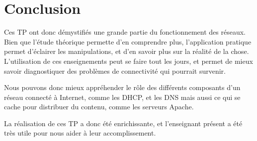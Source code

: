 \documentclass[12pt,a4paper]{book} %
\begin{document}
\cleardoublepage %

\pagestyle{empty}


\chapter*{Conclusion}

Ces TP ont donc démystifiés une grande partie du fonctionnement des réseaux. Bien que l'étude théorique permette d'en comprendre plus, l'application pratique permet d'éclairer les manipulations, et d'en savoir plus sur la réalité de la chose. L'utilisation de ces enseignements peut se faire tout les jours, et permet de mieux savoir diagnostiquer des problèmes de connectivité qui pourrait survenir.

Nous pouvons donc mieux appréhender le rôle des différents composants d'un réseau connecté à Internet, comme les DHCP, et les DNS mais aussi ce qui se cache pour distribuer du contenu, comme les serveurs Apache.

La réalisation de ces TP a donc été enrichissante, et l'enseignant présent a été très utile pour nous aider à leur accomplissement.

\pagestyle{fancy}

\end{document}
